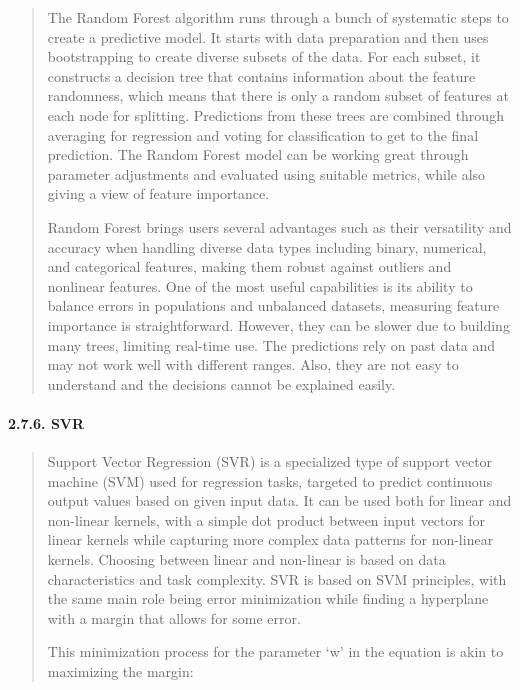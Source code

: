\documentclass[
]{article}
\begin{document}
\begin{quote}
The Random Forest algorithm runs through a bunch of systematic steps to
create a predictive model. It starts with data preparation and then uses
bootstrapping to create diverse subsets of the data. For each subset, it
constructs a decision tree that contains information about the feature
randomness, which means that there is only a random subset of features
at each node for splitting. Predictions from these trees are combined
through averaging for regression and voting for classification to get to
the final prediction. The Random Forest model can be working great
through parameter adjustments and evaluated using suitable metrics,
while also giving a view of feature importance.

Random Forest brings users several advantages such as their versatility
and accuracy when handling diverse data types including binary,
numerical, and categorical features, making them robust against outliers
and nonlinear features. One of the most useful capabilities is its
ability to balance errors in populations and unbalanced datasets,
measuring feature importance is straightforward. However, they can be
slower due to building many trees, limiting real-time use. The
predictions rely on past data and may not work well with different
ranges. Also, they are not easy to understand and the decisions cannot
be explained easily.
\end{quote}

\hypertarget{svr}{%
\paragraph{\texorpdfstring{\textbf{2.7.6. SVR}
}{2.7.6. SVR }}\label{svr}}

\begin{quote}
Support Vector Regression (SVR) is a specialized type of support vector
machine (SVM) used for regression tasks, targeted to predict continuous
output values based on given input data. It can be used both for linear
and non-linear kernels, with a simple dot product between input vectors
for linear kernels while capturing more complex data patterns for
non-linear kernels. Choosing between linear and non-linear is based on
data characteristics and task complexity. SVR is based on SVM
principles, with the same main role being error minimization while
finding a hyperplane with a margin that allows for some error.

This minimization process for the parameter `w' in the equation is akin
to maximizing the margin:
\end{quote}
\end{document}
